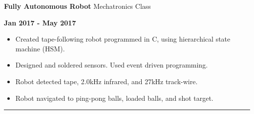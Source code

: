 \documentclass[paper=a4,fontsize=11pt]{article} %
\def \sectionSpace      {0.3cm}    %
\def \subSectionSpace   {0.25cm}     %
\def \leftColSpace      {0.1}       %
\def \middleColSpace    {0.71}       %
\def \bigMiddleColSpace {0.8}       %
\def \rightColSpace     {0.25}      %
\def \lineWidth         {20.25cm}   %
\def \lineThickness     {1pt}     %
\begin{document}
    \vspace{\subSectionSpace}  
    \noindent
    \begin{minipage}[t]{\leftColSpace\linewidth}
        \noindent \hfill
    \end{minipage}
    \begin{minipage}[t]{\middleColSpace\linewidth}
        \noindent \textbf{Fully Autonomous Robot} \quad Mechatronics Class
    \end{minipage}
    \begin{minipage}[t]{\rightColSpace\linewidth}
        \noindent \textbf{Jan 2017 - May 2017}
    \end{minipage}

    \noindent
    \begin{minipage}[t]{\leftColSpace\linewidth}
        \hfill
    \end{minipage}
    \begin{minipage}[t]{\bigMiddleColSpace\linewidth}
        \begin{itemize}[noitemsep,topsep=0pt]
        \item Created tape-following robot programmed in C, using hierarchical state machine (HSM). 
        \item Designed and soldered sensors. Used event driven programming. 
        \item Robot detected tape, 2.0kHz infrared, and 27kHz track-wire.\item Robot navigated to ping-pong balls, loaded balls, and shot target.
        \end{itemize}
    \end{minipage}

    \vspace{\sectionSpace}
    \noindent\rule{\lineWidth}{\lineThickness}
\end{document}
